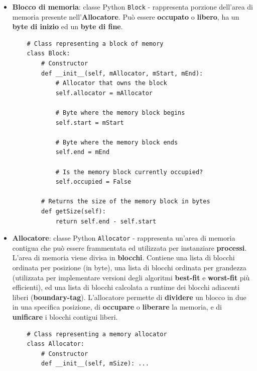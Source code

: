 \documentclass[12pt]{report}
\renewcommand\emph{\textbf}
\begin{document}
        \begin{itemize}
            \item \emph{Blocco di memoria}: classe Python \texttt{Block} - rappresenta porzione dell'area di memoria presente nell'\emph{Allocatore}. Può essere \emph{occupato} o \emph{libero}, ha un \emph{byte di inizio} ed un \emph{byte di fine}.

                \begin{verbatim}
    # Class representing a block of memory
    class Block:
        # Constructor
        def __init__(self, mAllocator, mStart, mEnd):
            # Allocator that owns the block
            self.allocator = mAllocator

            # Byte where the memory block begins
            self.start = mStart

            # Byte where the memory block ends
            self.end = mEnd

            # Is the memory block currently occupied?
            self.occupied = False

        # Returns the size of the memory block in bytes
        def getSize(self):
            return self.end - self.start
                \end{verbatim}

            \item \emph{Allocatore}: classe Python \texttt{Allocator} - rappresenta un'area di memoria contigua che può essere frammentata ed utilizzata per instanziare \emph{processi}. L'area di memoria viene divisa in \emph{blocchi}.  Contiene una lista di blocchi ordinata per posizione (in byte), una lista di blocchi ordinata per grandezza (utilizzata per implementare versioni degli algoritmi \emph{best-fit} e \emph{worst-fit} più efficienti), ed una lista di blocchi calcolata a runtime dei blocchi adiacenti liberi (\emph{boundary-tag}). 
            L'allocatore permette di \emph{dividere} un blocco in due in una specifica posizione, di \emph{occupare} o \emph{liberare} la memoria, e di \emph{unificare} i blocchi contigui liberi.

            \begin{verbatim}
    # Class representing a memory allocator
    class Allocator:
        # Constructor
        def __init__(self, mSize): ...


\end{verbatim}
\end{itemize}
\end{document}

